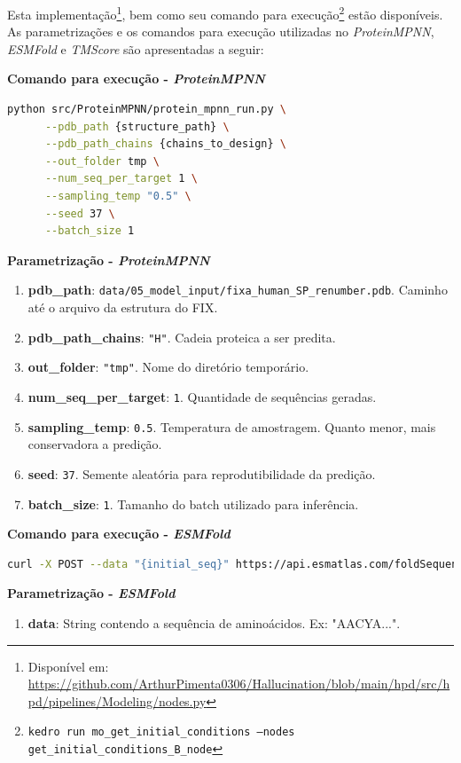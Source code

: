 Esta implementação\footnote{Disponível em: \url{https://github.com/ArthurPimenta0306/Hallucination/blob/main/hpd/src/hpd/pipelines/Modeling/nodes.py}},
bem como seu comando para execução\footnote{\texttt{kedro run mo\_get\_initial\_conditions --nodes get\_initial\_conditions\_B\_node}} estão  
disponíveis.
As parametrizações e os comandos para execução utilizadas no \textit{ProteinMPNN}, \textit{ESMFold} e \textit{TMScore} são apresentadas a seguir:

\textbf{Comando para execução - \textit{ProteinMPNN}}
\begin{lstlisting}[language=bash, breaklines=true, frame=single, backgroundcolor=\color{lightgray}]
  python src/ProteinMPNN/protein_mpnn_run.py \
      --pdb_path {structure_path} \
      --pdb_path_chains {chains_to_design} \
      --out_folder tmp \
      --num_seq_per_target 1 \
      --sampling_temp "0.5" \
      --seed 37 \
      --batch_size 1
  \end{lstlisting}
\textbf{Parametrização - \textit{ProteinMPNN}}
\begin{enumerate}
    \item \textbf{pdb\_path}: \texttt{data/05\_model\_input/fixa\_human\_SP\_renumber.pdb}. Caminho até o arquivo da estrutura do FIX. 
    \item \textbf{pdb\_path\_chains}: \texttt{"H"}. Cadeia proteica a ser predita. 
    \item \textbf{out\_folder}: \texttt{"tmp"}. Nome do diretório temporário. 
    \item \textbf{num\_seq\_per\_target}: \texttt{1}. Quantidade de sequências geradas. 
    \item \textbf{sampling\_temp}: \texttt{0.5}. Temperatura de amostragem. Quanto menor, mais conservadora a predição. 
    \item \textbf{seed}: \texttt{37}. Semente aleatória para reprodutibilidade da predição.
    \item \textbf{batch\_size}: \texttt{1}. Tamanho do batch utilizado para inferência. 
\end{enumerate}

\textbf{Comando para execução - \textit{ESMFold}}
\begin{lstlisting}[language=bash, breaklines=true, frame=single, backgroundcolor=\color{lightgray}]
  curl -X POST --data "{initial_seq}" https://api.esmatlas.com/foldSequence/v1/pdb/ > tmp/pred_initial_structure.pdb
\end{lstlisting}

\textbf{Parametrização - \textit{ESMFold}}
\begin{enumerate}
    \item \textbf{data}: String contendo a sequência de aminoácidos. Ex: "AACYA...".
\end{enumerate}


